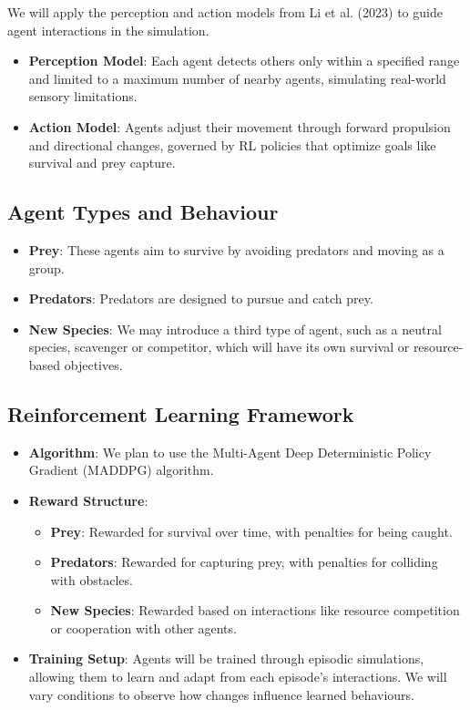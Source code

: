 \documentclass[9pt]{pnas-new}
\begin{document}
We will apply the perception and action models from Li et al. (2023) \cite{li2023predator} to guide agent interactions in the simulation.

\begin{itemize}
    \item \textbf{Perception Model}: Each agent detects others only within a specified range and limited to a maximum number of nearby agents, simulating real-world sensory limitations.
    \item \textbf{Action Model}: Agents adjust their movement through forward propulsion and directional changes, governed by RL policies that optimize goals like survival and prey capture.
\end{itemize}

\subsection{Agent Types and Behaviour}
\begin{itemize}
    \item \textbf{Prey}: These agents aim to survive by avoiding predators and moving as a group.
    \item \textbf{Predators}: Predators are designed to pursue and catch prey.
    \item \textbf{New Species}: We may introduce a third type of agent, such as a neutral species, scavenger or competitor, which will have its own survival or resource-based objectives.
\end{itemize}

\subsection{Reinforcement Learning Framework}
\begin{itemize}
    \item \textbf{Algorithm}: We plan to use the Multi-Agent Deep Deterministic Policy Gradient (MADDPG) algorithm.
    \item \textbf{Reward Structure}:
        \begin{itemize}
            \item \textbf{Prey}: Rewarded for survival over time, with penalties for being caught.
            \item \textbf{Predators}: Rewarded for capturing prey, with penalties for colliding with obstacles.
            \item \textbf{New Species}: Rewarded based on interactions like resource competition or cooperation with other agents.
        \end{itemize}
    \item \textbf{Training Setup}: Agents will be trained through episodic simulations, allowing them to learn and adapt from each episode's interactions. We will vary conditions to observe how changes influence learned behaviours.
\end{itemize}
\end{document}

